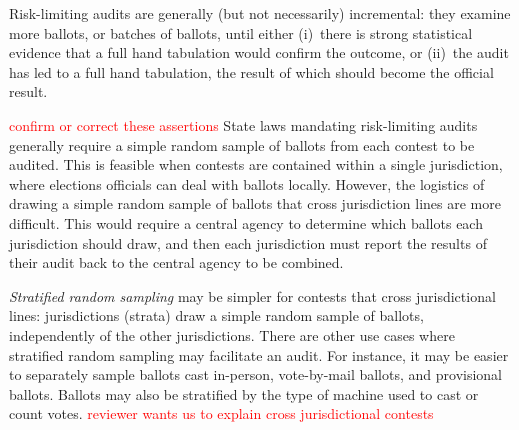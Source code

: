 \documentclass[runningheads]{llncs}
\newcommand{\comment}[1]{\textcolor{red}{\sc #1}}
\begin{document}
Risk-limiting audits are generally (but not necessarily) incremental: they examine more ballots, or batches of ballots,
until either (i)~there is strong statistical evidence that a full hand tabulation would confirm the outcome,
or (ii)~the audit has led to a full hand tabulation, the result of which should become the official
result.



\comment{confirm or correct these assertions}
State laws mandating risk-limiting audits generally require a simple random sample of ballots from each contest to be audited.
This is feasible when contests are contained within a single jurisdiction, where elections officials can deal with ballots locally.
However, the logistics of drawing a simple random sample of ballots that cross jurisdiction lines are more difficult.
This would require a central agency to determine which ballots each jurisdiction should draw, and then each jurisdiction must report the results of their audit back to the central agency to be combined.

\textit{Stratified random sampling} may be simpler for contests that cross jurisdictional lines:
jurisdictions (strata) draw a simple random sample of ballots, independently of the other jurisdictions.
There are other use cases where stratified random sampling may facilitate an audit.
For instance, it may be easier to separately sample ballots cast in-person, vote-by-mail ballots, and provisional ballots.
Ballots may also be stratified by the type of machine used to cast or count votes.
\comment{reviewer wants us to explain cross jurisdictional contests}
\end{document}
